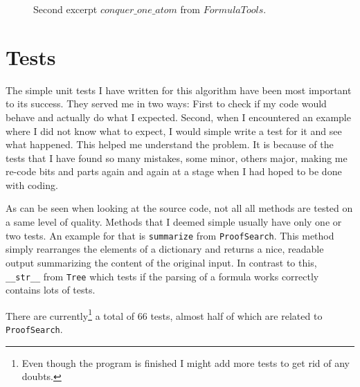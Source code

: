 \begin{figure}[H]
	\vspace{-10pt}
	
	\vspace{-10pt}
	\caption{Second excerpt $conquer\_one\_ atom$ from $FormulaTools$.}
\end{figure}

\bigskip


\section{Tests}
The simple unit tests I have written for this algorithm have been most important to its success. They served me in two ways: First to check if my code would behave and actually do what I expected. Second, when I encountered an example where I did not know what to expect, I would simple write a test for it and see what happened. This helped me understand the problem.
It is because of the tests that I have found so many mistakes, some minor, others major, making me re-code bits and parts again and again at a stage when I had hoped to be done with coding.

As can be seen when looking at the source code, not all all methods are tested on a same level of quality. Methods that I deemed simple usually have only one or two tests. An example for that is \texttt{summarize} from \texttt{ProofSearch}. This method simply rearranges the elements of a dictionary and returns a nice, readable output summarizing the content of the original input. In contrast to this, \texttt{\_\_str\_\_} from \texttt{Tree} which tests if the parsing of a formula works correctly contains lots of tests.

There are currently\footnote{Even though the program is finished I might add more tests to get rid of any doubts.} a total of 66 tests, almost half of which are related to \texttt{ProofSearch}. 